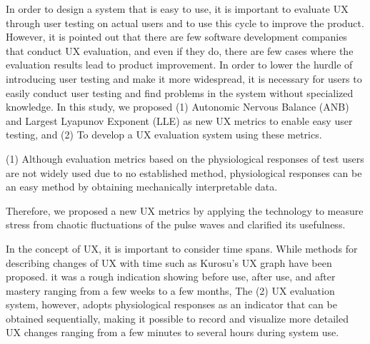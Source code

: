 \begin{eabstract}

In order to design a system that is easy to use, it is important to evaluate UX through user testing on actual users and to use this cycle to improve the product. However, it is pointed out that there are few software development companies that conduct UX evaluation, and even if they do, there are few cases where the evaluation results lead to product improvement. In order to lower the hurdle of introducing user testing and make it more widespread, it is necessary for users to easily conduct user testing and find problems in the system without specialized knowledge. In this study, we proposed (1) Autonomic Nervous Balance (ANB) and Largest Lyapunov Exponent (LLE) as new UX metrics to enable easy user testing, and  (2) To develop a UX evaluation system using these metrics.

(1) Although evaluation metrics based on the physiological responses of test users are not widely used due to no established method, physiological responses can be an easy method by obtaining mechanically interpretable data. 

Therefore, we proposed a new UX metrics by applying the technology to measure stress from chaotic fluctuations of the pulse waves and clarified its usefulness.

In the concept of UX, it is important to consider time spans. While methods for describing changes of UX with time such as Kurosu's UX graph have been proposed. it was a rough indication showing before use, after use, and after mastery ranging from a few weeks to a few months,  The (2) UX evaluation system, however, adopts physiological responses as an indicator that can be obtained sequentially, making it possible to record and visualize more detailed UX changes ranging from a few minutes to several hours during system use.


\end{eabstract}
